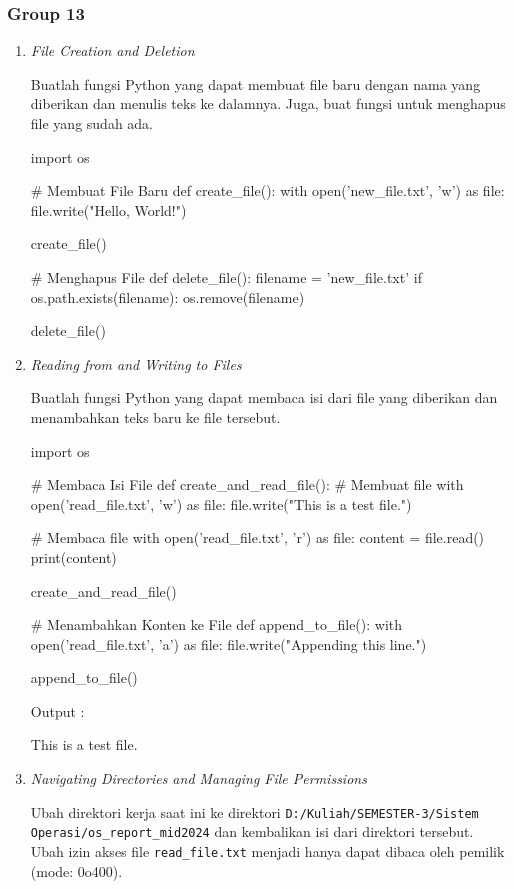 \documentclass[12pt]{article}
\begin{document}
\subsubsection{Group 13}
\begin{enumerate}
    \item \textit{File Creation and Deletion}
        \par Buatlah fungsi Python yang dapat membuat file baru dengan nama yang diberikan dan menulis teks ke dalamnya. Juga, buat fungsi untuk menghapus file yang sudah ada.
\begin{python}
import os

# Membuat File Baru
def create_file():
    with open('new_file.txt', 'w') as file:
        file.write("Hello, World!")

create_file()

# Menghapus File
def delete_file():
    filename = 'new_file.txt'
    if os.path.exists(filename):
        os.remove(filename)

delete_file()
\end{python}
        
    \item \textit{Reading from and Writing to Files}
        \par  Buatlah fungsi Python yang dapat membaca isi dari file yang diberikan dan menambahkan teks baru ke file tersebut.
\begin{python}
import os

# Membaca Isi File
def create_and_read_file():
    # Membuat file
    with open('read_file.txt', 'w') as file:
        file.write("This is a test file.")
    
    # Membaca file
    with open('read_file.txt', 'r') as file:
        content = file.read()
        print(content)

create_and_read_file()

# Menambahkan Konten ke File
def append_to_file():
    with open('read_file.txt', 'a') as file:
        file.write("Appending this line.\n")

append_to_file()
\end{python}
    \par Output :
    \par This is a test file.

    \item \textit{Navigating Directories and Managing File Permissions}
        \par Ubah direktori kerja saat ini ke direktori \texttt{D:/Kuliah/SEMESTER-3/Sistem Operasi/os\_report\_mid2024} dan kembalikan isi dari direktori tersebut. Ubah izin akses file \texttt{read\_file.txt} menjadi hanya dapat dibaca oleh pemilik (mode: 0o400).


\end{enumerate}
\end{document}
